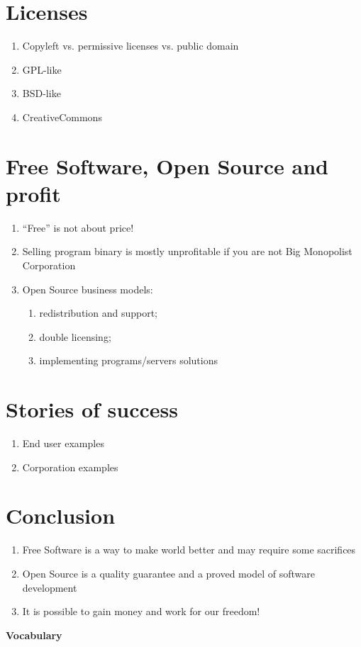 \documentclass[10pt,a4paper]{article}
\newcommand{\bee}{\begin{enumerate}\setlength{\itemsep}{-0.65mm}}
\newcommand{\ene}{\end{enumerate}}
\begin{document}
\begin{multicols}{2}
\section{Licenses}
\bee
  \item Copyleft vs. permissive licenses vs. public domain
  \item GPL-like
  \item BSD-like
  \item CreativeCommons
\ene

\section{Free Software, Open Source and profit}
\bee
  \item ``Free'' is not about price!
  \item Selling program binary is mostly unprofitable if you are not Big Monopolist Corporation
  \item Open Source business models:
  \bee
    \item redistribution and support;
    \item double licensing;
    \item implementing programs/servers solutions
  \ene
\ene

\section{Stories of success}
\bee
  \item End user examples
  \item Corporation examples
\ene

\section*{Conclusion}
\bee
  \item Free Software is a way to make world better and may require some sacrifices
  \item Open Source is a quality guarantee and a proved model of software development
  \item It is possible to gain money and work for our freedom!
\ene

\end{multicols}

\begin{center}
{\LARGE \bfseries Vocabulary}
\end{center}
\end{document}
